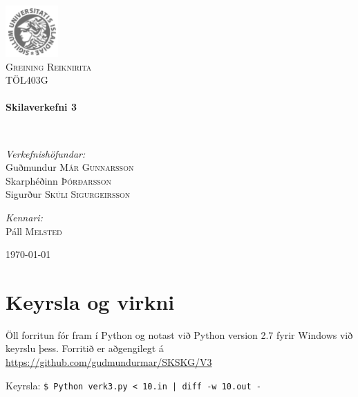 \documentclass{article}
\begin{document}
\begin {titlepage}
\begin{center}
\includegraphics[width=0.15\textwidth]{./Haskoli_Islands_rett.jpg}~\\[1cm]

\textsc{\LARGE Greining Reiknirita}\\[1.5cm]

\textsc{\Large TÖL403G}\\[0.5cm]

\HRule \\[0.4cm]
{ \huge \bfseries Skilaverkefni 3\\[0.4cm] }

\HRule \\[1.5cm]

\begin{minipage}{0.5\textwidth}
\begin{flushleft} \large
\emph{Verkefnishöfundar:}
\\ Guðmundur\textsc{ Már Gunnarsson }
\\ Skarphéðinn \textsc{Þórðarsson}
\\ Sigurður \textsc{Skúli Sigurgeirsson}

\end{flushleft}
\end{minipage}
\begin{minipage}{0.4\textwidth}
\begin{flushright} \large
\emph{Kennari:} \\
Páll \textsc{Melsted}
\end{flushright}
\end{minipage}

\vfill

{\large \today}

\end{center}

\end{titlepage}

\section {Keyrsla og virkni}
Öll forritun fór fram í Python og notast við Python version 2.7 fyrir Windows við keyrslu þess. 
Forritið er aðgengilegt á \url{https://github.com/gudmundurmar/SKSKG/V3}
 \begin {center}Keyrsla: \texttt {\$ Python verk3.py < 10.in | diff -w 10.out -} \end {center}
\end{document}
